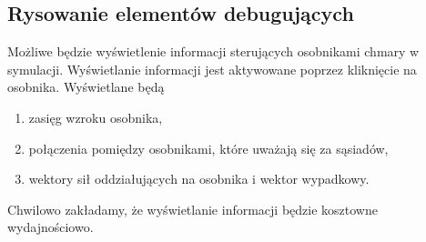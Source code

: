 \subsection{Rysowanie elementów debugujących}
Możliwe będzie wyświetlenie informacji sterujących osobnikami chmary w
symulacji. Wyświetlanie informacji jest aktywowane poprzez kliknięcie na
osobnika. Wyświetlane będą
\begin{enumerate}[nosep]
    \item zasięg wzroku osobnika,
    \item połączenia pomiędzy osobnikami, które uważają się za sąsiadów,
    \item wektory sił oddziałujących na osobnika i wektor wypadkowy.
\end{enumerate}
Chwilowo zakładamy, że wyświetlanie informacji będzie kosztowne wydajnościowo.

